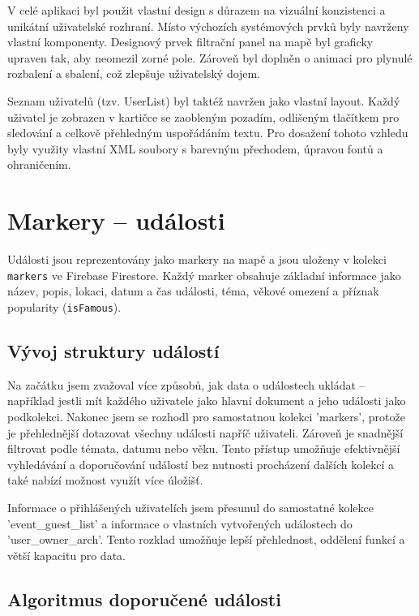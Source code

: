 V celé aplikaci byl použit vlastní design s důrazem na vizuální konzistenci a unikátní uživatelské rozhraní. Místo výchozích systémových prvků byly navrženy vlastní komponenty. Designový prvek filtrační panel na mapě byl graficky upraven tak, aby neomezil zorné pole. Zároveň byl doplněn o animaci pro plynulé rozbalení a sbalení, což zlepšuje uživatelský dojem.

Seznam uživatelů (tzv. UserList) byl taktéž navržen jako vlastní layout. Každý uživatel je zobrazen v kartičce se zaobleným pozadím, odlišeným tlačítkem pro sledování a celkově přehledným uspořádáním textu. Pro dosažení tohoto vzhledu byly využity vlastní XML soubory s barevným přechodem, úpravou fontů a ohraničením.
\cite{MaterialComponents}







\section{Markery – události}

Události jsou reprezentovány jako markery na mapě a jsou uloženy v kolekci \texttt{markers} ve Firebase Firestore. Každý marker obsahuje základní informace jako název, popis, lokaci, datum a čas události, téma, věkové omezení a příznak popularity (\texttt{isFamous}).

\subsection{Vývoj struktury událostí}

Na začátku jsem zvažoval více způsobů, jak data o událostech ukládat – například jestli mít každého uživatele jako hlavní dokument a jeho události jako podkolekci. Nakonec jsem se rozhodl pro samostatnou kolekci 'markers', protože je přehlednější dotazovat všechny události napříč uživateli. Zároveň je snadnější filtrovat podle témata, datumu nebo věku. Tento přístup umožňuje efektivnější vyhledávání a doporučování událostí bez nutnosti procházení dalších kolekcí a také nabízí možnost využít více úložišť.

Informace o přihlášených uživatelích jsem přesunul do samostatné kolekce 'event\_guest\_list' a informace o vlastních vytvořených událostech do 'user\_owner\_arch'. Tento rozklad umožňuje lepší přehlednost, oddělení funkcí a větší kapacitu pro data.


\subsection{Algoritmus doporučené události}

